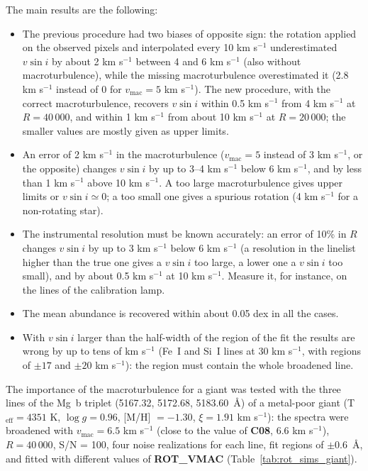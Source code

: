 \documentclass[modern]{aastex701}
\begin{document}
The main results are the following:
\begin{itemize}
    \item The previous procedure had two biases of opposite sign: the rotation applied on the observed pixels and interpolated every 10 km s$^{-1}$ underestimated $v \sin i$ by about 2 km s$^{-1}$ between 4 and 6 km s$^{-1}$ (also without macroturbulence), while the missing macroturbulence overestimated it (2.8 km s$^{-1}$ instead of 0 for $v_{\mathrm{mac}} = 5$ km s$^{-1}$). The new procedure, with the correct macroturbulence, recovers $v \sin i$ within 0.5 km s$^{-1}$ from 4 km s$^{-1}$ at $R = 40\,000$, and within 1 km s$^{-1}$ from about 10 km s$^{-1}$ at $R = 20\,000$; the smaller values are mostly given as upper limits.
    \item An error of 2 km s$^{-1}$ in the macroturbulence ($v_{\mathrm{mac}} = 5$ instead of 3 km s$^{-1}$, or the opposite) changes $v \sin i$ by up to 3--4 km s$^{-1}$ below 6 km s$^{-1}$, and by less than 1 km s$^{-1}$ above 10 km s$^{-1}$. A too large macroturbulence gives upper limits or $v \sin i \simeq 0$; a too small one gives a spurious rotation (4 km s$^{-1}$ for a non-rotating star).
    \item The instrumental resolution must be known accurately: an error of 10\% in $R$ changes $v \sin i$ by up to 3 km s$^{-1}$ below 6 km s$^{-1}$ (a resolution in the linelist higher than the true one gives a $v \sin i$ too large, a lower one a $v \sin i$ too small), and by about 0.5 km s$^{-1}$ at 10 km s$^{-1}$. Measure it, for instance, on the lines of the calibration lamp.
    \item The mean abundance is recovered within about 0.05 dex in all the cases.
    \item With $v \sin i$ larger than the half-width of the region of the fit the results are wrong by up to tens of km s$^{-1}$ (Fe~I and Si~I lines at 30 km s$^{-1}$, with regions of $\pm 17$ and $\pm 20$ km s$^{-1}$): the region must contain the whole broadened line.
\end{itemize}
The importance of the macroturbulence for a giant was tested with the three lines of the Mg~b triplet (5167.32, 5172.68, 5183.60~\AA) of a metal-poor giant (T$_{\mathrm{eff}} = 4351$ K, $\log g = 0.96$, [M/H] $= -1.30$, $\xi = 1.91$ km s$^{-1}$): the spectra were broadened with $v_{\mathrm{mac}} = 6.5$ km s$^{-1}$ (close to the value of {\bf C08}, 6.6 km s$^{-1}$), $R = 40\,000$, S/N = 100, four noise realizations for each line, fit regions of $\pm 0.6$~\AA, and fitted with different values of {\bf ROT\_VMAC} (Table~\ref{tab:rot_sims_giant}).
\end{document}
